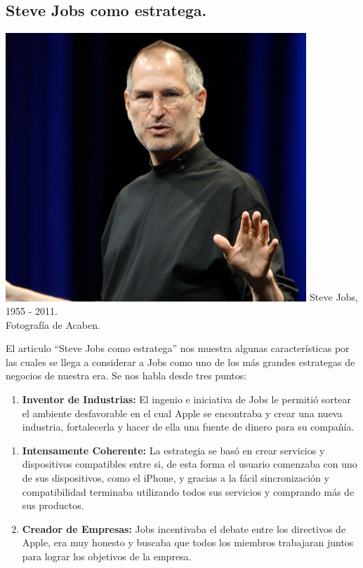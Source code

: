 \documentclass{article}
\begin{document}
\begin{adjustwidth}{-1.5cm}{-1.5cm}
	\section*{Steve Jobs como estratega.}
	\begin{minipage}{0.35\textwidth}
		\begin{center}
			\includegraphics[width=0.85\textwidth]{jobs.png}
		Steve Jobs, 1955 - 2011.\\Fotografía de Acaben\cite{img}.
		\end{center}
	\end{minipage}
	\hfill
	\begin{minipage}{0.88\textwidth}
		El articulo ``Steve Jobs como estratega'' nos muestra algunas características
		por las cuales se llega a considerar a Jobs como uno de los más grandes
		estrategas de negocios de nuestra era. Se nos habla desde tres puntos:
		\begin{enumerate}
			\item[1.]
				\textbf{Inventor de Industrias:} El ingenio e iniciativa de Jobs
				le permitió sortear el ambiente desfavorable en el cual Apple se
				encontraba y crear una nueva industria, fortalecerla y hacer de
				ella una fuente de dinero para su compañía.
		\end{enumerate}
	\end{minipage}
	\begin{enumerate}
		\item[2.]
			\textbf{Intensamente Coherente:} La estrategia se basó en crear servicios
			y dispositivos compatibles entre si, de esta forma el usuario comenzaba
			con uno de sus dispositivos, como el iPhone, y gracias a la fácil 
			sincronización y compatibilidad terminaba utilizando todos sus servicios
			y comprando más de sus productos.
		\item[3.]
			\textbf{Creador de Empresas:} Jobs incentivaba el debate entre los 
			directivos de Apple, era muy honesto y  buscaba que todos los miembros
			trabajaran juntos para lograr los objetivos de la empresa.
	\end{enumerate}


\end{adjustwidth}
\end{document}
